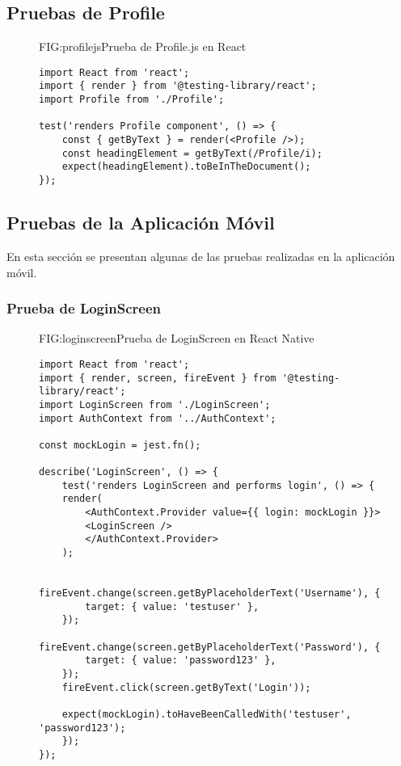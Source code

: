 \newpage

\subsection{Pruebas de Profile}
\begin{figure}[Prueba de Profile.js]{FIG:profilejs}{Prueba de Profile.js en React}
    \begin{verbatim}
import React from 'react';
import { render } from '@testing-library/react';
import Profile from './Profile';

test('renders Profile component', () => {
    const { getByText } = render(<Profile />);
    const headingElement = getByText(/Profile/i);
    expect(headingElement).toBeInTheDocument();
});
    \end{verbatim}
    \end{figure}

\newpage

\subsection{Pruebas de la Aplicación Móvil\label{SEC:PRUEBASMOVIL}}
En esta sección se presentan algunas de las pruebas realizadas en la aplicación móvil.

\subsubsection{Prueba de LoginScreen}

\begin{figure}[Prueba de LoginScreen]{FIG:loginscreen}{Prueba de LoginScreen en React Native}
    \begin{verbatim}
import React from 'react';
import { render, screen, fireEvent } from '@testing-library/react';
import LoginScreen from './LoginScreen';
import AuthContext from '../AuthContext';

const mockLogin = jest.fn();

describe('LoginScreen', () => {
    test('renders LoginScreen and performs login', () => {
    render(
        <AuthContext.Provider value={{ login: mockLogin }}>
        <LoginScreen />
        </AuthContext.Provider>
    );

    fireEvent.change(screen.getByPlaceholderText('Username'), {
        target: { value: 'testuser' },
    });
    fireEvent.change(screen.getByPlaceholderText('Password'), {
        target: { value: 'password123' },
    });
    fireEvent.click(screen.getByText('Login'));

    expect(mockLogin).toHaveBeenCalledWith('testuser', 'password123');
    });
});

    \end{verbatim}
    \end{figure}

